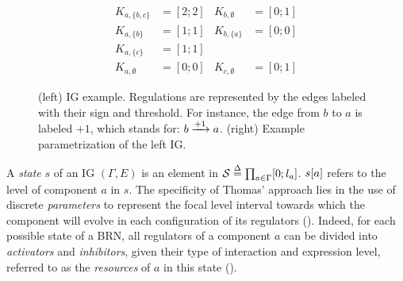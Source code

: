 \begin{figure}[t]
\begin{minipage}{0.4\linewidth}
\centering
{}
\end{minipage}
\begin{minipage}{0.6\linewidth}
\centering
\begin{align*}
K_{a,\{b,c\}} &= [2 ; 2] & K_{b,\emptyset} &= [0 ; 1] \\
K_{a,\{b\}} &= [1 ; 1] & K_{b,\{a\}} &= [0 ; 0] \\
K_{a,\{c\}} &= [1 ; 1] &&\\
K_{a,\emptyset} &= [0 ; 0] & K_{c,\emptyset} &= [0 ; 1]
\end{align*}
\end{minipage}
\caption{\label{fig:runningBRN}
(left)
IG example.
Regulations are represented by the edges labeled with their sign and threshold.
For instance, the edge from $b$ to $a$ is labeled $+1$, which stands for: $b \xrightarrow{+ 1} a$.
(right)
Example parametrization of the left IG.
}
\end{figure}

A \emph{state} $s$ of an IG $(\Gamma, E)$ is an element in $\mathcal{S} \stackrel{\Delta}= \prod_{a \in \Gamma} [0;l_a]$.
${s[a]}$ refers to the level of component $a$ in $s$.
The specificity of Thomas' approach lies in the use of discrete \emph{parameters} to represent the
focal level interval towards which the component will evolve in each configuration of its regulators
().
Indeed, for each possible state of a BRN, all regulators of a component $a$ can be divided into
\emph{activators} and \emph{inhibitors}, given their type of interaction and expression level,
referred to as the \emph{resources} of $a$ in this state ().
%

